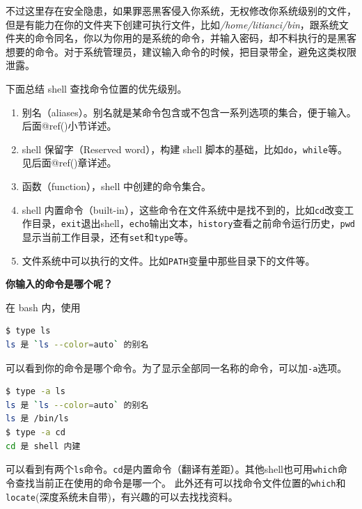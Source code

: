 \documentclass[doctor,openright,twoside]{sjtuthesis}
\providecommand{\tightlist}{%
    \setlength{\itemsep}{0pt}\setlength{\parskip}{0pt}}
\newcommand{\passthrough}[1]{#1}
\theoremstyle{plain}
\theoremstyle{definition}
\theoremstyle{remark}
\theoremstyle{ocrenumbox}
\theoremstyle{plain}
\begin{document}
不过这里存在安全隐患，如果罪恶黑客侵入你系统，无权修改你系统级别的文件，但是有能力在你的文件夹下创建可执行文件，比如\emph{/home/litianci/bin}，跟系统文件夹的命令同名，你以为你用的是系统的命令，并输入密码，却不料执行的是黑客想要的命令。对于系统管理员，建议输入命令的时候，把目录带全，避免这类权限泄露。

下面总结 shell 查找命令位置的优先级别。

\begin{enumerate}
\def\labelenumi{\arabic{enumi}.}
\tightlist
\item
  别名（aliases）。别名就是某命令包含或不包含一系列选项的集合，便于输入。后面@ref()小节详述。
\item
  shell 保留字（Reserved word），构建 shell
  脚本的基础，比如\passthrough{\lstinline!do!}，\passthrough{\lstinline!while!}等。见后面@ref()章详述。
\item
  函数（function），shell 中创建的命令集合。
\item
  shell
  内置命令（built-in），这些命令在文件系统中是找不到的，比如\passthrough{\lstinline!cd!}改变工作目录，\passthrough{\lstinline!exit!}退出shell，\passthrough{\lstinline!echo!}输出文本，\passthrough{\lstinline!history!}查看之前命令运行历史，\passthrough{\lstinline!pwd!}显示当前工作目录，还有\passthrough{\lstinline!set!}和\passthrough{\lstinline!type!}等。
\item
  文件系统中可以执行的文件。比如\passthrough{\lstinline!PATH!}变量中那些目录下的文件等。
\end{enumerate}

\textbf{你输入的命令是哪个呢？}

在 bash 内，使用

\begin{lstlisting}[language=bash]
$ type ls
ls 是 `ls --color=auto` 的别名
\end{lstlisting}

可以看到你的命令是哪个命令。为了显示全部同一名称的命令，可以加\passthrough{\lstinline!-a!}选项。

\begin{lstlisting}[language=bash]
$ type -a ls
ls 是 `ls --color=auto` 的别名
ls 是 /bin/ls
$ type -a cd
cd 是 shell 内建
\end{lstlisting}

可以看到有两个\passthrough{\lstinline!ls!}命令。\passthrough{\lstinline!cd!}是内置命令（翻译有差距）。其他shell也可用\passthrough{\lstinline!which!}命令查找当前正在使用的命令是哪一个。
此外还有可以找命令文件位置的\passthrough{\lstinline!which!}和\passthrough{\lstinline!locate!}(深度系统未自带)，有兴趣的可以去找找资料。
\end{document}
